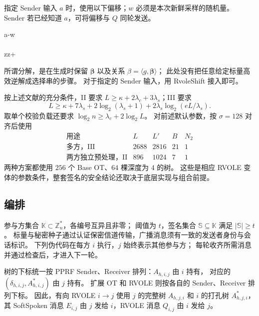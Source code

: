 指定 Sender 输入 $a$ 时，使用以下偏移；$w$ 必须是本次新鲜采样的随机量。
Sender 若已经知道 $a$，可将偏移与 $Q$ 同轮发送。

\begin{protocol}[
  name=RvoleShift,
  params={\party{S}: (a,w,y),~\party{R}: (\beta,z)},
  returns={\party{S}: y,~\party{R}: z},
  st={y+z=a\beta},
  layout=multiline
]
  \delta\coloneq a-w \\
   \\
  z\coloneq z+\beta\delta \\
  \pcreturn
\end{protocol}

所谓分解，是在生成时保留 $\boldsymbol\beta$ 以及关系 $\beta=\langle g,\boldsymbol\beta\rangle$；
此处没有把任意给定标量高效逆解成选择串的步骤。
对于指定的 Sender 输入，用 RvoleShift 接入即可。

按上述文献的充分条件，II 要求 $L\ge\kappa+2\lambda_c+3\lambda_s$；III 要求
\[
  L\ge\kappa+7\lambda_s+2\log_2(\lambda_s+1)
     +2\lambda_s\log_2(eL/\lambda_s).
\]
取单个校验负载还要求 $\log_2n\ge\lambda_c+2\log_2L$。
对前述默认参数，按 $\sigma=128$ 对齐后使用
\[
  \begin{array}{c|rrrr}
    \text{用途}&L&L'&B&N_2\\\hline
    \text{多方，III}&2688&2816&21&1\\
    \text{两方独立预处理，II}&896&1024&7&1
  \end{array}
\]
两种方案都使用 $256$ 个 Base OT、$64$ 棵深度为 $4$ 的树。
这些是相应 RVOLE 变体的参数条件，整套签名的安全结论还取决于底层实现与组合前提。

\subsection{编排}

参与方集合 $\mathbb K\subset\mathbb Z_n^*$，各编号互异且非零；
阈值为 $t$，签名集合 $\mathbb S\subseteq\mathbb K$ 满足 $|\mathbb S|\ge t$。
标量与秘密种子通过认证保密信道传输，广播消息须有一致的发送者身份与会话标识。
下列伪代码在每方 $i$ 执行，$j$ 始终表示其他参与方；
每轮收齐所需消息并通过检查后，才进入下一轮。

树的下标统一按 PPRF Sender、Receiver 排列：$A_{h,i,j}$ 由 $i$ 持有，
对应的 $(\delta_{h,i,j},A^*_{h,i,j})$ 由 $j$ 持有。
扩展 OT 和 RVOLE 则按各自的 Sender、Receiver 排列下标。
因此，有向 RVOLE $i\to j$ 使用 $j$ 的完整树 $A_{h,j,i}$ 和 $i$ 的打孔树 $A^*_{h,j,i}$，
其 SoftSpoken 消息 $E_{i,j}$ 由 $j$ 发给 $i$，RVOLE 消息 $Q_{i,j}$ 由 $i$ 发给 $j$。

